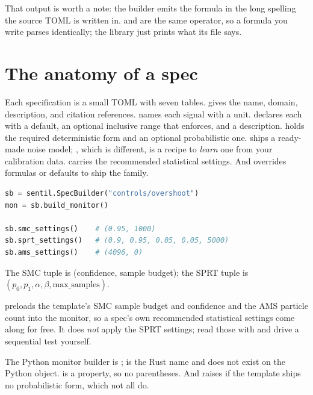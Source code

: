 That output is worth a note: the builder emits the formula in the long  spelling the source TOML is written in.  and  are the same operator, so a  formula you write parses identically; the library just prints what its file says.

\section{The anatomy of a spec}

Each specification is a small TOML with seven tables. \code{[metadata]} gives the name, domain, description, and citation references. \code{[variables]} names each signal with a unit. \code{[parameters]} declares each  with a default, an optional inclusive range that  enforces, and a description. \code{[formulas]} holds the required deterministic form and an optional probabilistic one.  ships a ready-made noise model; , which is different, is a recipe to \emph{learn} one from your calibration data.  carries the recommended statistical settings. And  overrides formulas or defaults to ship the family.

\begin{lstlisting}[language=Python]
sb = sentil.SpecBuilder("controls/overshoot")
mon = sb.build_monitor()

sb.smc_settings()    # (0.95, 1000)
sb.sprt_settings()   # (0.9, 0.95, 0.05, 0.05, 5000)
sb.ams_settings()    # (4096, 0)
\end{lstlisting}

The SMC tuple is (confidence, sample budget); the SPRT tuple is $(p_0, p_1, \alpha, \beta, \text{max\_samples})$.

 preloads the template's SMC sample budget and confidence and the AMS particle count into the monitor, so a spec's own recommended statistical settings come along for free. It does \emph{not} apply the SPRT settings; read those with  and drive a sequential test yourself.

\begin{pitfall}
The Python monitor builder is ;  is the Rust name and does not exist on the Python object.  is a property, so no parentheses. And  raises if the template ships no probabilistic form, which not all do.
\end{pitfall}

